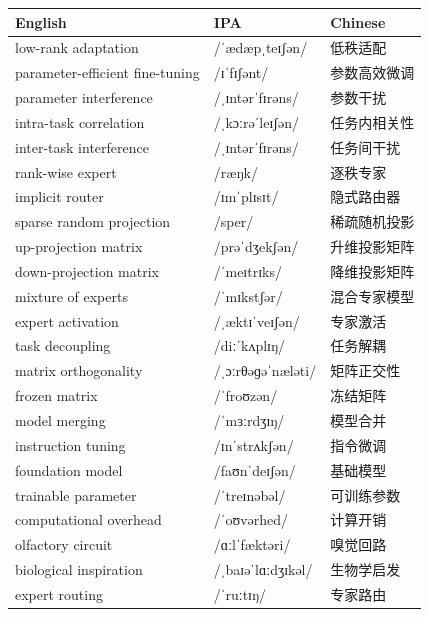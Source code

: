 \documentclass[UTF8,12pt,a4paper]{ctexart}
\providecommand{\zh}[1]{#1}
\begin{document}
\begin{tabular*}{\textwidth}{@{\extracolsep{\fill}}lll@{}}
\toprule
\textbf{English} & \textbf{IPA} & \textbf{Chinese} \\
\midrule
low-rank adaptation & {\ipafont /ˈædæpˌteɪʃən/} & \zh{低秩适配} \\
parameter-efficient fine-tuning & {\ipafont /ɪˈfɪʃənt/} & \zh{参数高效微调} \\
parameter interference & {\ipafont /ˌɪntərˈfɪrəns/} & \zh{参数干扰} \\
intra-task correlation & {\ipafont /ˌkɔːrəˈleɪʃən/} & \zh{任务内相关性} \\
inter-task interference & {\ipafont /ˌɪntərˈfɪrəns/} & \zh{任务间干扰} \\
rank-wise expert & {\ipafont /ræŋk/} & \zh{逐秩专家} \\
implicit router & {\ipafont /ɪmˈplɪsɪt/} & \zh{隐式路由器} \\
sparse random projection & {\ipafont /sper/} & \zh{稀疏随机投影} \\
up-projection matrix & {\ipafont /prəˈdʒekʃən/} & \zh{升维投影矩阵} \\
down-projection matrix & {\ipafont /ˈmeɪtrɪks/} & \zh{降维投影矩阵} \\
mixture of experts & {\ipafont /ˈmɪkstʃər/} & \zh{混合专家模型} \\
expert activation & {\ipafont /ˌæktɪˈveɪʃən/} & \zh{专家激活} \\
task decoupling & {\ipafont /diːˈkʌplɪŋ/} & \zh{任务解耦} \\
matrix orthogonality & {\ipafont /ˌɔːrθəɡəˈnæləti/} & \zh{矩阵正交性} \\
frozen matrix & {\ipafont /ˈfroʊzən/} & \zh{冻结矩阵} \\
model merging & {\ipafont /ˈmɜːrdʒɪŋ/} & \zh{模型合并} \\
instruction tuning & {\ipafont /ɪnˈstrʌkʃən/} & \zh{指令微调} \\
foundation model & {\ipafont /faʊnˈdeɪʃən/} & \zh{基础模型} \\
trainable parameter & {\ipafont /ˈtreɪnəbəl/} & \zh{可训练参数} \\
computational overhead & {\ipafont /ˈoʊvərhed/} & \zh{计算开销} \\
olfactory circuit & {\ipafont /ɑːlˈfæktəri/} & \zh{嗅觉回路} \\
biological inspiration & {\ipafont /ˌbaɪəˈlɑːdʒɪkəl/} & \zh{生物学启发} \\
expert routing & {\ipafont /ˈruːtɪŋ/} & \zh{专家路由} \\

\end{tabular*}
\end{document}
